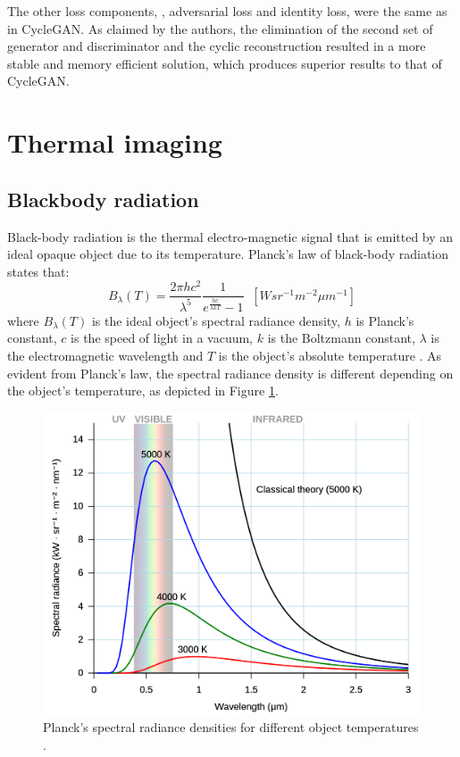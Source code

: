 The other loss components, \ie, adversarial loss and identity loss, were the same as in CycleGAN.
As claimed by the authors, the elimination of the second set of generator and discriminator and the cyclic reconstruction resulted in a more stable and memory efficient solution, which produces superior results to that of CycleGAN.

\section{Thermal imaging}

\subsection{Blackbody radiation}
Black-body radiation is the thermal electro-magnetic signal that is emitted by an ideal opaque object due to its temperature.
Planck's law of black-body radiation states that:
\begin{equation} \label{eq:Plancks-law}
  B_{\lambda}(T) = \frac{2\pi hc^2}{\lambda^5}\frac{1}{e^{\frac{hc}{\lambda kT}} - 1} \; \; \left[W sr^{-1} m^{-2} \mu m^{-1}\right]
\end{equation}
where $B_{\lambda}(T)$ is the ideal object's spectral radiance density, $h$ is Planck's constant, $c$ is the speed of light in a vacuum, $k$ is the Boltzmann constant, $\lambda$ is the electromagnetic wavelength and $T$ is the object's absolute temperature \cite{FundamentalsOfInfraredThermalImaging}.
As evident from Planck's law, the spectral radiance density is different depending on the object's temperature, as depicted in Figure \ref{fig:Planck_density}.
\begin{figure}[H]
  \centering
  \includegraphics[width=\linewidth]{../figs/methods/planck.png}
  \caption{Planck's spectral radiance densities for different object temperatures \cite{enwiki:1128338285}.}
  \label{fig:Planck_density}
\end{figure}

